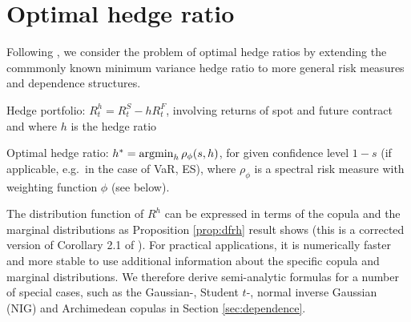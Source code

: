 \section{Optimal hedge ratio}
\label{sec:optimal-hedge-ratio}

Following \citep{barbi2014copula}, we consider the problem of optimal
hedge ratios by extending the commmonly known minimum variance hedge
ratio to more general risk measures and dependence
structures.\medskip

Hedge portfolio: $R_t^h = R_t^S - h R_t^F$, involving returns of spot
and future contract and where $h$ is the hedge ratio

Optimal hedge ratio: $h^\ast = \argmin_h \rho_\phi(s,h)$, for given
confidence level $1-s$ (if applicable, e.g.\ in the case of VaR, ES),
where $\rho_\phi$ is a spectral risk measure with weighting function
$\phi$ (see below).

The distribution function of $R^h$ can be expressed in terms of the
copula and the marginal distributions as Proposition \ref{prop:dfrh}
result shows (this is a corrected version of Corollary 2.1 of
\citep{barbi2014copula}). For practical applications, it is numerically
faster and more stable to use additional information about the
specific copula and marginal distributions. We therefore derive
semi-analytic formulas for a number of special cases, such as the
Gaussian-, Student $t$-, normal inverse Gaussian (NIG) and Archimedean
copulas in Section \ref{sec:dependence}.


